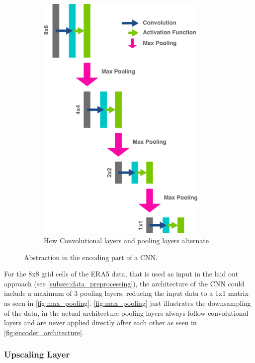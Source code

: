 \begin{figure}
\begin{subfigure}{0.25\textwidth}
        \includegraphics[width=0.9\textwidth]{resources/images/encoder_architecture.png}
        \caption{How Convolutional layers and pooling layers alternate}
        \label{fig:encoder_architecture}
    \end{subfigure}
    \caption{Abstraction in the encoding part of a CNN.}
\end{figure}


For the 8x8 grid cells of the ERA5 data, that is used as input in the laid out approach (see \autoref{subsec:data_preprocessing}), the architecture of the CNN could include a maximum of 3 pooling layers, reducing the input data to a 1x1 matrix as seen in \autoref{fig:max_pooling}. \autoref{fig:max_pooling} just illustrates the downsampling of the data, in the actual architecture pooling layers always follow convolutional layers and are never applied directly after each other as seen in \autoref{fig:encoder_architecture}. 

\subsubsection*{Upscaling Layer}

